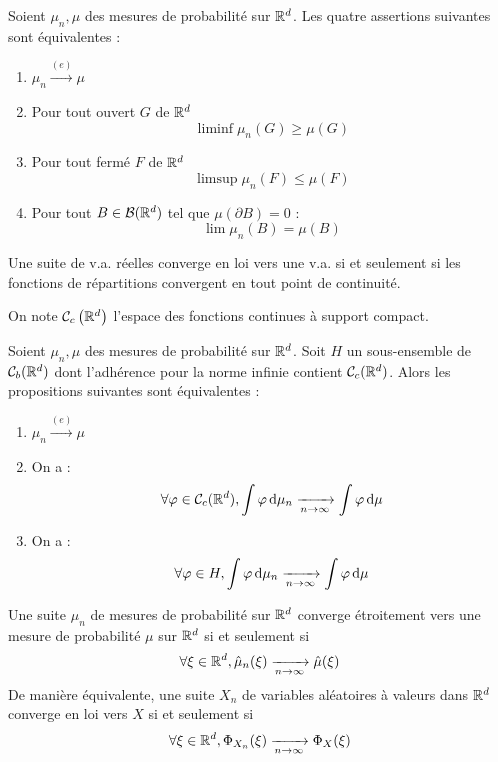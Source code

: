 \documentclass{cours}
\begin{document}
\begin{proposition}
    Soient $\mu_{n}, \mu$ des mesures de probabilité sur $\mathbb{R}^{d}$. Les quatre assertions suivantes sont équivalentes :
    \begin{enumerate}
        \item $\mu_{n} \xrightarrow{(e)} \mu$
        \item Pour tout ouvert $G$ de $\mathbb{R}^{d}$
              \[
                  \liminf \mu_{n}(G) \geq \mu(G)
              \]
        \item Pour tout fermé $F$ de $\mathbb{R}^{d}$
              \[
                  \limsup \mu_{n}(F) \leq \mu(F)
              \]
        \item Pour tout $B \in \mathcal{B}(\mathbb{R}^{d})$ tel que $\mu\left(\partial B\right) = 0$ :
              \[
                  \lim \mu_{n}(B) = \mu(B)
              \]
    \end{enumerate}
\end{proposition}

\begin{proposition}
    Une suite de v.a. réelles converge en loi vers une v.a. si et seulement si les fonctions de répartitions convergent en tout point de continuité. 
\end{proposition}

On note $\mathcal{C}_{c}\left(\mathbb{R}^{d}\right)$ l'espace des fonctions continues à support compact.

\begin{proposition}
    Soient $\mu_{n}, \mu$ des mesures de probabilité sur $\mathbb{R}^{d}$. Soit $H$ un sous-ensemble de $\mathcal{C}_{b}(\mathbb{R}^{d})$ dont l'adhérence pour la norme infinie contient $\mathcal{C}_{c}(\mathbb{R}^{d})$. Alors les propositions suivantes sont équivalentes :
    \begin{enumerate}
        \item $\mu_{n}\xrightarrow{(e)} \mu$
        \item On a : 
        \[
            \forall \varphi \in \mathcal{C}_{c}(\mathbb{R}^{d}), \int \varphi {\rm \, d}\mu_{n} \xrightarrow[n \to \infty]{}\int \varphi {\rm \, d}\mu
        \]
        \item On a : 
        \[
            \forall \varphi \in H, \int \varphi {\rm \, d} \mu_{n} \xrightarrow[n\to \infty]{}\int \varphi {\rm \, d} \mu
        \]
    \end{enumerate}
\end{proposition}

\begin{theorem}[Lévy]
    Une suite $\mu_{n}$ de mesures de probabilité sur $\mathbb{R}^{d}$ converge étroitement vers une mesure de probabilité $\mu$ sur $\mathbb{R}^{d}$ si et seulement si
    \[  
        \forall \xi \in \mathbb{R}^{d}, \hat{\mu}_{n}(\xi) \xrightarrow[n \to \infty]{}\hat{\mu}(\xi)
    \]
    De manière équivalente, une suite $X_{n}$ de variables aléatoires à valeurs dans $\mathbb{R}^{d}$ converge en loi vers $X$ si et seulement si 
    \[
        \forall \xi \in \mathbb{R}^{d}, \Phi_{X_{n}}(\xi) \xrightarrow[n \to \infty]{} \Phi_{X}(\xi)
    \]
\end{theorem}
\end{document}
